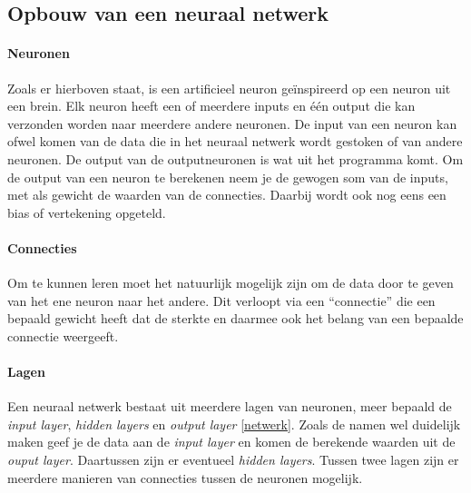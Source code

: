 \documentclass[a4paper,twoside,kulak]{kulakreport}
\begin{document}
\subsection{Opbouw van een neuraal netwerk}
\paragraph{Neuronen}
Zoals er hierboven staat, is een artificieel neuron geïnspireerd op een neuron uit een brein. Elk neuron heeft een of meerdere inputs en één output die kan verzonden worden naar meerdere andere neuronen. De input van een neuron kan ofwel komen van de data die in het neuraal netwerk wordt gestoken of van andere neuronen. De output van de outputneuronen is wat uit het programma komt. Om de output van een neuron te berekenen neem je de gewogen som van de inputs, met als gewicht de waarden van de connecties. Daarbij wordt ook nog eens een bias of vertekening opgeteld.

\paragraph{Connecties}
Om te kunnen leren moet het natuurlijk mogelijk zijn om de data door te geven van het ene neuron naar het andere. Dit verloopt via een “connectie” die een bepaald gewicht heeft dat de sterkte en daarmee ook het belang van een bepaalde connectie weergeeft.

\paragraph{Lagen}
Een neuraal netwerk bestaat uit meerdere lagen van neuronen, meer bepaald de \emph{input layer}, \emph{hidden layers} en \emph{output layer} \ref{netwerk}. Zoals de namen wel duidelijk maken geef je de data aan de \emph{input layer} en komen de berekende waarden uit de \emph{ouput layer}. Daartussen zijn er eventueel \emph{hidden layers}. Tussen twee lagen zijn er meerdere manieren van connecties tussen de neuronen mogelijk.
\end{document}
